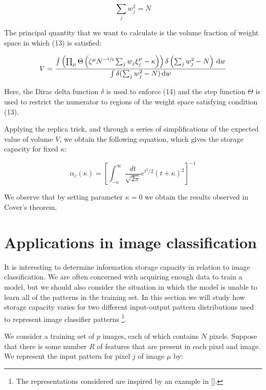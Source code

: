 \documentclass[a4paper, 11pt]{article}
\begin{document}
\begin{equation}
    \sum_j w_j^2 = N
\end{equation}

The principal quantity that we want to calculate is the volume fraction of weight space in which (13) is satisfied:

\begin{equation}
    V = \frac{\int \left( \prod_\mu \Theta \left( \zeta^\mu N^{-\sfrac{1}{2}}\sum_j w_{j} \xi_j^\mu - \kappa \right) \right) \delta \left( \sum_j w_j^2 - N \right) \, \mathrm{d} w}{\int \delta(\sum_j w_j^2 - N) \, \mathrm{d} w}
\end{equation}

Here, the Dirac delta function $\delta$ is used to enforce (14) and the step function $\Theta$ is used to restrict the numerator to regions of the weight space satisfying condition (13).

Applying the replica trick, and through a series of simplifications of the expected value of volume $V$, we obtain the following equation, which gives the storage capacity for fixed $\kappa$:

\begin{equation}
    \alpha_c (\kappa) = \left[ \int_{-\kappa}^\infty \frac{dt}{\sqrt{2 \pi}} e^{t^2 / 2} (t + \kappa)^2 \right] ^{-1}
\end{equation}

We observe that by setting parameter $\kappa = 0$ we obtain the results observed in Cover's theorem.

\section{Applications in image classification}

It is interesting to determine information storage capacity in relation to image classification. We are often concerned with acquiring enough data to train a model, but we should also consider the situation in which the model is unable to learn all of the patterns in the training set. In this section we will study how storage capacity varies for two different input-output pattern distributions used to represent image classifier patterns \footnote{The representations considered are inspired by an example in [].}.

We consider a training set of $p$ images, each of which contains $N$ pixels. Suppose that there is some number $R$ of features that are present in each pixel and image. We represent the input pattern for pixel $j$ of image $\mu$ by:
\end{document}
